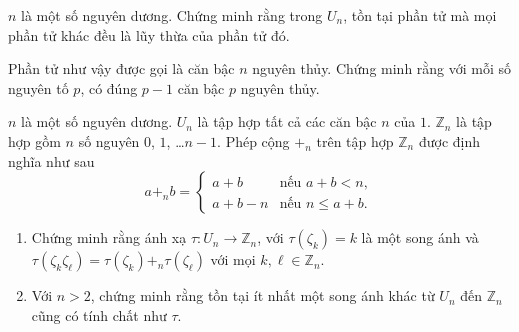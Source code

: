 \begin{exercise}
	$n$ là một số nguyên dương. Chứng minh rằng trong $U_{n}$, tồn tại phần tử mà mọi phần tử khác đều là lũy thừa của phần tử đó.

	Phần tử như vậy được gọi là căn bậc $n$ nguyên thủy. Chứng minh rằng với mỗi số nguyên tố $p$, có đúng $p-1$ căn bậc $p$ nguyên thủy.
\end{exercise}

\begin{exercise}
    $n$ là một số nguyên dương. $U_{n}$ là tập hợp tất cả các căn bậc $n$ của $1$. $\mathbb{Z}_{n}$ là tập hợp gồm $n$ số nguyên $0$, $1$, \ldots $n-1$. Phép cộng $+_{n}$ trên tập hợp $\mathbb{Z}_{n}$ được định nghĩa như sau
	\[
		a +_{n} b = \begin{cases}
			a + b     & \text{nếu $a + b < n$},   \\
			a + b - n & \text{nếu $n\leq a + b$}.
		\end{cases}
	\]

    \begin{enumerate}[label={(\roman*)}]
        \item Chứng minh rằng ánh xạ $\tau: U_{n}\to \mathbb{Z}_{n}$, với $\tau(\zeta_{k}) = k$ là một song ánh và $\tau(\zeta_{k}\zeta_{\ell}) = \tau(\zeta_{k}) +_{n} \tau(\zeta_{\ell})$ với mọi $k, \ell\in \mathbb{Z}_{n}$.
        \item Với $n > 2$, chứng minh rằng tồn tại ít nhất một song ánh khác từ $U_{n}$ đến $\mathbb{Z}_{n}$ cũng có tính chất như $\tau$.
    \end{enumerate}
\end{exercise}
